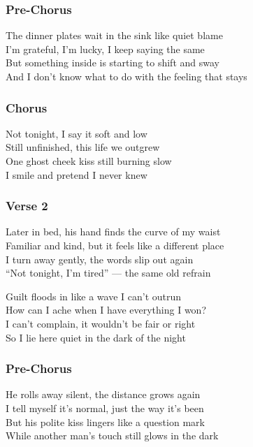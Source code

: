 \subsubsection{Pre-Chorus}\label{pre-chorus-66}

The dinner plates wait in the sink like quiet blame\\
I'm grateful, I'm lucky, I keep saying the same\\
But something inside is starting to shift and sway\\
And I don't know what to do with the feeling that stays

\subsubsection{Chorus}\label{chorus-78}

Not tonight, I say it soft and low\\
Still unfinished, this life we outgrew\\
One ghost cheek kiss still burning slow\\
I smile and pretend I never knew

\subsubsection{Verse 2}\label{verse-2-26}

Later in bed, his hand finds the curve of my waist\\
Familiar and kind, but it feels like a different place\\
I turn away gently, the words slip out again\\
``Not tonight, I'm tired'' --- the same old refrain

Guilt floods in like a wave I can't outrun\\
How can I ache when I have everything I won?\\
I can't complain, it wouldn't be fair or right\\
So I lie here quiet in the dark of the night

\subsubsection{Pre-Chorus}\label{pre-chorus-67}

He rolls away silent, the distance grows again\\
I tell myself it's normal, just the way it's been\\
But his polite kiss lingers like a question mark\\
While another man's touch still glows in the dark

